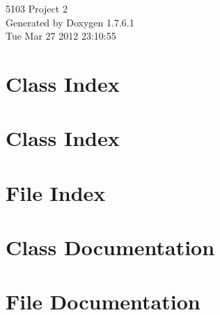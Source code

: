 \documentclass[a4paper]{book}
\begin{document}
\hypersetup{pageanchor=false,citecolor=blue}
\begin{titlepage}
\vspace*{7cm}
\begin{center}
{\Large 5103 \-Project 2 }\\
\vspace*{1cm}
{\large \-Generated by Doxygen 1.7.6.1}\\
\vspace*{0.5cm}
{\small Tue Mar 27 2012 23:10:55}\\
\end{center}
\end{titlepage}
\clearemptydoublepage
{}
\tableofcontents
\clearemptydoublepage
{}
\hypersetup{pageanchor=true,citecolor=blue}
\chapter{\-Class \-Index}

\chapter{\-Class \-Index}

\chapter{\-File \-Index}

\chapter{\-Class \-Documentation}



























\chapter{\-File \-Documentation}









\printindex
\end{document}
